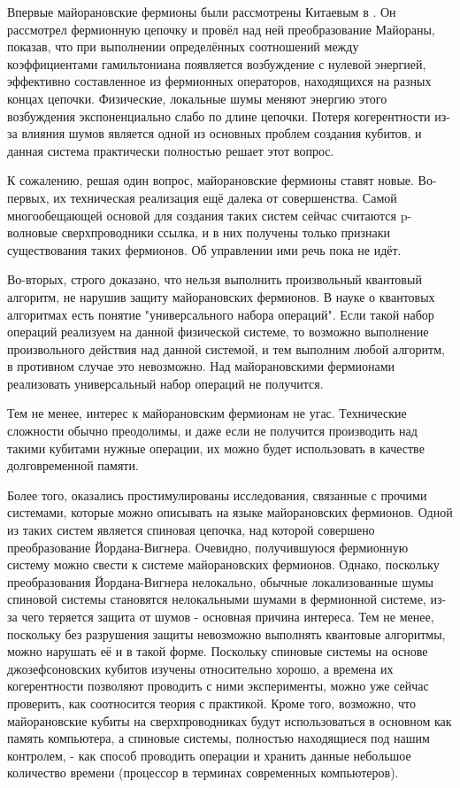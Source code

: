 \documentclass[a4paper,12pt]{article}
\theoremstyle{plain} %
\theoremstyle{definition} %
\theoremstyle{remark} %
\begin{document}
Впервые майорановские фермионы были рассмотрены Китаевым в \cite{kitaev}. Он рассмотрел фермионную цепочку и провёл над ней преобразование Майораны, показав, что при выполнении определённых соотношений между коэффициентами гамильтониана появляется возбуждение с нулевой энергией, эффективно составленное из фермионных операторов, находящихся на разных концах цепочки. Физические, локальные шумы меняют энергию этого возбуждения экспоненциально слабо по длине цепочки. Потеря когерентности из-за влияния шумов является одной из основных проблем создания кубитов, и данная система практически полностью решает этот вопрос.

К сожалению, решая один вопрос, майорановские фермионы ставят новые. Во-первых, их техническая реализация ещё далека от совершенства. Самой многообещающей основой для создания таких систем сейчас считаются p-волновые сверхпроводники {\color{red}ссылка}, и в них получены только признаки существования таких фермионов. Об управлении ими речь пока не идёт.

Во-вторых, строго доказано, что нельзя выполнить произвольный квантовый алгоритм, не нарушив защиту майорановских фермионов. В науке о квантовых алгоритмах есть понятие "универсального набора операций"$ $. Если такой набор операций реализуем на данной физической системе, то возможно выполнение произвольного действия над данной системой, и тем выполним любой алгоритм, в противном случае это невозможно. Над майорановскими фермионами реализовать универсальный набор операций не получится.

Тем не менее, интерес к майорановским фермионам не угас. Технические сложности обычно преодолимы, и даже если не получится производить над такими кубитами нужные операции, их можно будет использовать в качестве долговременной памяти. 

Более того, оказались простимулированы исследования, связанные с прочими системами, которые можно описывать на языке майорановских фермионов. Одной из таких систем является спиновая цепочка{\color{red}, над которой совершено преобразование} Йордана-Вигнера. Очевидно, получившуюся фермионную систему можно свести к системе майорановских фермионов. Однако, поскольку преобразования Йордана-Вигнера нелокально, обычные локализованные шумы спиновой системы становятся нелокальными шумами в фермионной системе, из-за чего теряется защита от шумов - основная причина интереса. Тем не менее, поскольку без разрушения защиты невозможно выполнять квантовые алгоритмы, можно нарушать её и в такой форме. Поскольку спиновые системы на основе джозефсоновских кубитов изучены относительно хорошо, а времена их когерентности позволяют проводить с ними эксперименты, можно уже сейчас проверить, как соотносится теория с практикой. Кроме того, возможно, что майорановские кубиты на сверхпроводниках будут использоваться в основном как память компьютера, а спиновые системы, полностью находящиеся под нашим контролем, - как способ проводить операции и хранить данные небольшое количество времени (процессор в терминах современных компьютеров).
\end{document}
